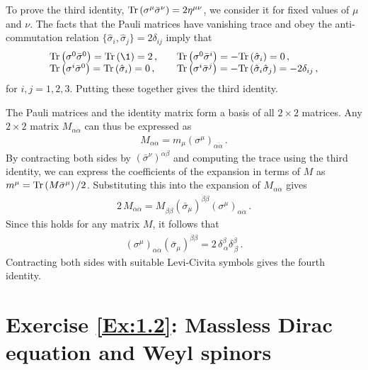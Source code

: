 To prove the third identity, $\mathrm{Tr}\left(\sigma^{\mu} \bar{\sigma}^{\nu}\right) = 2 \eta^{\mu\nu}$, we consider it for fixed values of $\mu$ and $\nu$. 
The facts that the Pauli matrices have vanishing trace and obey the anti-commutation relation $\{\hat\sigma_i,\hat\sigma_j \} = 2 \delta_{ij}$ imply that
\begin{align}
\begin{array}{ll}
\tr{\sigma^0 \bar{\sigma}^0} = \tr{\1} = 2 \,, & \quad \tr{\sigma^0 \bar{\sigma}^i} = -\tr{ \hat{\sigma}_i} = 0\,, \\
\tr{\sigma^i \bar{\sigma}^0} = \tr{\hat{\sigma}_i} = 0 \,, & \quad \tr{\sigma^i \bar{\sigma}^j} = -\tr{ \hat\sigma_i \hat\sigma_j } = - 2\delta_{ij}\,, \\
\end{array}
\end{align}
for $i,j=1,2,3$. Putting these together gives the third identity.

The Pauli matrices and the identity matrix form a basis of all $2\times2$ matrices. Any $2\times2$ matrix $M_{\alpha \dot\alpha}$ can thus be expressed as
\begin{align}
M_{\alpha \dot\alpha} = m_{\mu} (\sigma^{\mu})_{\alpha \dot\alpha} \,.
\end{align}
By contracting both sides by $(\bar\sigma^{\nu})^{\dot\alpha \beta}$ and computing the trace using the third identity, we can express the coefficients of the expansion in terms of $M$ as $m^{\mu} = \mathrm{Tr}\left(M \bar{\sigma}^{\mu}\right)/2$.
Substituting this into the expansion of $M_{\alpha\dot\alpha}$ gives 
\begin{align}
2 \, M_{\alpha\dot\alpha} = M_{\beta\dot\beta} (\bar{\sigma}_{\mu})^{\dot\beta \beta} (\sigma^{\mu})_{\alpha\dot\alpha} \,.
\end{align}
Since this holds for any matrix $M$, it follows that
\begin{align}
(\sigma^{\mu})_{\alpha\dot\alpha}  (\bar{\sigma}_{\mu})^{\dot\beta \beta}  = 2 \, \delta^{\beta}_{\, \alpha} \delta^{\dot\beta}_{\, \beta} \,.
\end{align}
Contracting both sides with suitable Levi-Civita symbols gives the fourth identity.


\section*{Exercise \ref{Ex:1.2}: Massless Dirac equation and Weyl spinors}
\label{Prob:1.2}

